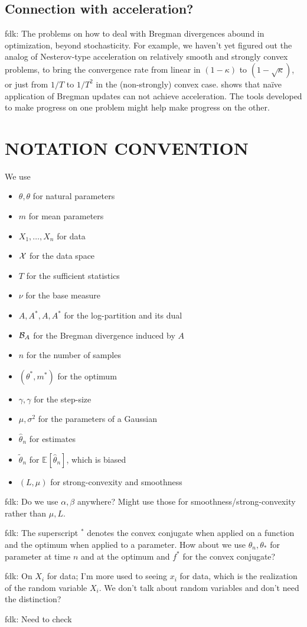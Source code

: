 \documentclass[twoside]{article}
\let\oldsection\section
\renewcommand{\section}[1]{\oldsection{\texorpdfstring{\uppercase{#1}}{#1}}}
\newcommand{\fdk}[1]{\textcolor{Periwinkle}{fdk:#1}}
\newcommand*{\expect}[2][]{\ensuremath{\mathbb{E}_{#1} \left[ #2 \right] }} %
\newcommand{\logpart}{A}
\newcommand{\conj}{\logpart^*}
\newcommand{\nat}{\theta}
\newcommand{\m}{m}
\newcommand{\lr}{\gamma} %
\begin{document}
\subsection{Connection with acceleration?}
\fdk{
The problems on how to deal with Bregman divergences abound in optimization, beyond stochasticity.
For example, we haven't yet figured out the analog of Nesterov-type acceleration
on relatively smooth and strongly convex problems,
to bring the convergence rate from linear in $(1-\kappa)$ to $(1-\sqrt{\kappa})$,
or just from $1/T$ to $1/T^2$ in the (non-strongly) convex case.
\citet{dragomir2021optimal}  shows that naïve application of Bregman updates can not achieve acceleration.
The tools developed to make progress on one problem might help make progress on the other.
}










\newpage
\section{Notation convention}
We use
\begin{itemize}
	\item $\theta, \nat$ for natural parameters
	\item $\m$ for mean parameters
	\item $X_1,\ldots,X_n$ for data
	\item ${\mathcal X}$ for the data space
	\item $T$ for the sufficient statistics
	\item $\nu$ for the base measure
	\item $A, A^*, \logpart, \conj$ for the log-partition and its dual
	\item ${\mathcal B}_A$ for the Bregman divergence induced by $A$
	\item $n$ for the number of samples
	\item $(\theta^*,m^*)$ for the optimum
	\item $\gamma, \lr$ for the step-size
	\item $\mu,\sigma^2$ for the parameters of a Gaussian
	\item $\hat\theta_n$ for estimates
	\item $\tilde\theta_n$ for $\expect{\hat\theta_n}$, which is biased
	\item $(L, \mu)$ for strong-convexity and smoothness
\end{itemize}

\fdk{
	Do we use $\alpha, \beta$ anywhere?
	Might use those for smoothness/strong-convexity rather than $\mu, L$.
}

\fdk{
	The superscript ${}^*$ denotes the convex conjugate when applied on a function
	and the optimum when applied to a parameter.
	How about we use $\theta_n, \theta_*$ for parameter at time $n$ and at the optimum
	and $f^*$ for the convex conjugate?
}

\fdk{
	On $X_i$ for data; I'm more used to seeing $x_i$ for data, which is the realization of the random variable $X_i$.
	We don't talk about random variables and don't need the distinction?
}

\fdk{
	Need to check
}
\end{document}
